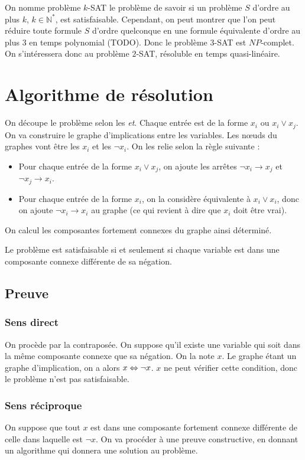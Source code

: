 On nomme problème $k$-SAT le problème de savoir si un problème $S$ d'ordre au
plus $k$, $k\in\mathbb{N}^*$, est satisfaisable. Cependant, on peut montrer
que l'on peut réduire toute formule $S$ d'ordre quelconque en une formule
équivalente d'ordre au plus $3$ en temps polynomial (TODO). Donc le problème
$3$-SAT est $NP$-complet. On s'intéressera donc au problème $2$-SAT, résoluble
en temps quasi-linéaire.

\section{Algorithme de résolution}
On découpe le problème selon les \emph{et}. Chaque entrée est de la forme $x_i$
ou $x_i \vee x_j$. On va construire le graphe d'implications entre les
variables. Les nœuds du graphes vont être les $x_i$ et les $\neg x_i$. On les
relie selon la règle suivante : \begin{itemize}
 \item Pour chaque entrée de la forme $x_i \vee x_j$, on ajoute les arrêtes
       $\neg x_i \rightarrow x_j$ et $\neg x_j \rightarrow x_i$.
 \item Pour chaque entrée de la forme $x_i$, on la considère équivalente à
       $x_i \vee x_i$, donc on ajoute $\neg x_i \rightarrow x_i$ au graphe (ce
       qui revient à dire que $x_i$ doit être vrai).
\end{itemize}

On calcul les composantes fortement connexes du graphe ainsi déterminé.

Le problème est satisfaisable si et seulement si chaque variable est dans une
composante connexe différente de sa négation.

\subsection{Preuve}
\subsubsection{Sens direct}
On procède par la contraposée. On suppose qu'il existe une variable qui soit
dans la même composante connexe que sa négation. On la note $x$. Le graphe
étant un graphe d'implication, on a alors $x \Leftrightarrow \neg x$. $x$ ne peut
vérifier cette condition, donc le problème n'est pas satisfaisable.

\subsubsection{Sens réciproque}
On suppose que tout $x$ est dans une composante fortement connexe différente de
celle dans laquelle est $\neg x$. On va procéder à une preuve constructive, en
donnant un algorithme qui donnera une solution au problème.

